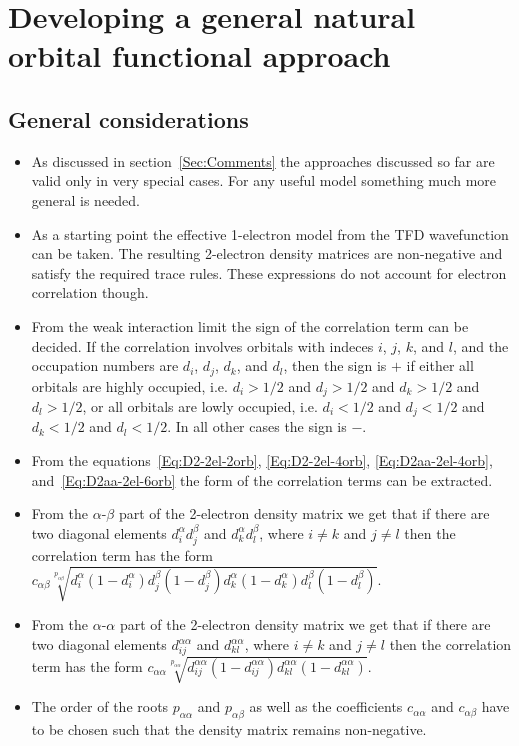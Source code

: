 \documentclass[aip,graphicx]{revtex4-1}
\begin{document}
\section{Developing a general natural orbital functional approach}
\subsection{General considerations}
\begin{itemize}
\item As discussed in section~\ref{Sec:Comments} the approaches discussed so far are valid only in very special cases. For any useful model something much more general is needed. 
\item As a starting point the effective 1-electron model from the TFD wavefunction can be taken. The resulting 2-electron density matrices are non-negative and satisfy the required trace rules. These expressions do not account for electron correlation though.
\item From the weak interaction limit the sign of the correlation term can be decided. If the correlation involves orbitals with indeces $i$, $j$, $k$, and $l$, and the occupation numbers are $d_i$, $d_j$, $d_k$, and $d_l$, then the sign is $+$ if either all orbitals are highly occupied, i.e. $d_i>1/2$ and $d_j>1/2$ and $d_k>1/2$ and $d_l>1/2$, or all orbitals are lowly occupied, i.e. $d_i<1/2$ and $d_j<1/2$ and $d_k<1/2$ and $d_l<1/2$. In all other cases the sign is $-$.
\item From the equations~\ref{Eq:D2-2el-2orb}, \ref{Eq:D2-2el-4orb}, \ref{Eq:D2aa-2el-4orb}, and~\ref{Eq:D2aa-2el-6orb} the form of the correlation terms can be extracted. 
\item From the $\alpha$-$\beta$ part of the 2-electron density matrix we get that if there are two diagonal elements $d_i^\alpha d_j^\beta$ and $d_k^\alpha d_l^\beta$, where $i \neq k$ and $j \neq l$ then the correlation term has the form $c_{\alpha\beta}\sqrt[p_{\alpha\beta}]{d_i^\alpha(1-d_i^\alpha)d_j^\beta(1-d_j^\beta)d_k^\alpha(1-d_k^\alpha)d_l^\beta(1-d_l^\beta)}$.
\item From the $\alpha$-$\alpha$ part of the 2-electron density matrix we get that if there are two diagonal elements $d_{ij}^{\alpha\alpha}$ and $d_{kl}^{\alpha\alpha}$, where $i \neq k$ and $j \neq l$ then the correlation term has the form $c_{\alpha\alpha}\sqrt[p_{\alpha\alpha}]{d_{ij}^{\alpha\alpha}(1-d_{ij}^{\alpha\alpha})d_{kl}^{\alpha\alpha}(1-d_{kl}^{\alpha\alpha})}$.
\item The order of the roots $p_{\alpha\alpha}$ and $p_{\alpha\beta}$ as well as the coefficients $c_{\alpha\alpha}$ and $c_{\alpha\beta}$ have to be chosen such that the density matrix remains non-negative. 

\end{itemize}
\end{document}
